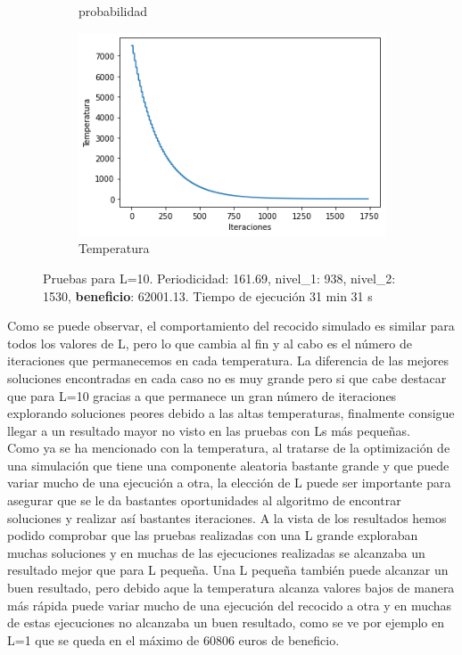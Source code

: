 \documentclass[a4paper,12pt]{article}
\begin{document}
\begin{figure}[H]
\begin{subfigure}{0.24\textwidth}
			\caption{probabilidad}
		\end{subfigure}
		\hfill
		\begin{subfigure}{0.24\textwidth}
			\centering
			\includegraphics[width=\textwidth]{include/L10/temperatura.png}
			\caption{Temperatura}
		\end{subfigure}
		\caption{Pruebas para L=10. Periodicidad: 161.69, nivel\_1: 938,  nivel\_2: 1530, \textbf{beneficio}: 62001.13. Tiempo de ejecución 31 min 31 s}
	\end{figure}


	
	Como se puede observar, el comportamiento del recocido simulado es similar para todos los valores de L, pero lo que cambia al fin y al cabo es el número de iteraciones que permanecemos en cada temperatura. La diferencia de las mejores soluciones encontradas en cada caso no es muy grande pero si que cabe destacar que para L=10 gracias a que permanece un gran número de iteraciones explorando soluciones peores debido a las altas temperaturas, finalmente consigue llegar a un resultado mayor no visto en las pruebas con Ls más pequeñas.\\

	Como ya se ha mencionado con la temperatura, al tratarse de la optimización de una simulación que tiene una componente aleatoria bastante grande y que puede variar mucho de una ejecución a otra, la elección de L puede ser importante para asegurar que se le da bastantes oportunidades al algoritmo de encontrar soluciones y realizar así bastantes iteraciones. A la vista de los resultados hemos podido comprobar que las pruebas realizadas con una L grande exploraban muchas soluciones y en muchas de las ejecuciones realizadas se alcanzaba un resultado mejor que para L pequeña. Una L pequeña también puede alcanzar un buen resultado, pero debido aque la temperatura alcanza valores bajos de manera más rápida puede variar mucho de una ejecución del recocido a otra y en muchas de estas ejecuciones no alcanzaba un buen resultado, como se ve por ejemplo en L=1 que se queda en el máximo de 60806 euros de beneficio.
\end{document}
